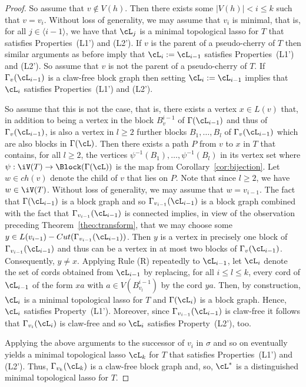 \begin{proof}
So assume that $v\not\in V(h)$. Then there exists some $|V(h)|< i\leq k$ such
that $v=v_i$. Without loss of generality, we may assume that $v_i$ is minimal,
that is, for all $j\in\langle i-1\rangle$, we have that $\cL_j$ is a minimal
topological lasso for $T$ that satisfies Properties~(L1') and (L2'). If $v$ is
the parent of a pseudo-cherry of $T$ then similar arguments as before imply
that $\cL_i:=\cL_{i-1}$ satisfies Properties~(L1') and (L2'). So assume that
$v$ is not the parent of a pseudo-cherry of $T$.  If $\Gamma_v(\cL_{i-1})$ is
a claw-free block graph then setting $\cL_i:=\cL_{i-1}$ implies that $\cL_i$
satisfies Properties~(L1') and (L2').

So assume that this is not the case, that is, there exists a vertex $x\in
L(v)$ that, in addition to being a vertex in the block $B_v^{i-1}$ of
$\Gamma(\cL_{i-1})$ and thus of $\Gamma_v(\cL_{i-1})$, is also a vertex in
$l\geq 2$ further blocks $B_1,\ldots, B_l$ of $\Gamma_v(\cL_{i-1})$ which are
also blocks in $\Gamma(\cL)$. Then there exists a path $P$ from $v$ to $x$ in
$T$ that contains, for all $l\geq 2$, the vertices $\psi^{-1}(B_1),\ldots,
\psi^{-1}(B_l)$ in its vertex set where $\psi:\iV(T)\to \Block(\Gamma(\cL))$
is the map from Corollary~\ref{cor:bijection}. Let $w\in ch(v)$ denote the
child of $v$ that lies on $P$. Note that since $l\geq 2$, we have $w\in
\iV(T)$. Without loss of generality, we may assume that $w=v_{i-1}$.  The fact
that $\Gamma(\cL_{i-1})$ is a block graph and so $\Gamma_{v_{i-1}}(\cL_{i-1})$
is a block graph combined with the fact that $\Gamma_{v_{i-1}}(\cL_{i-1})$ is
connected implies, in view of the observation preceding
Theorem~\ref{theo:transform}, that we may choose some $y\in
L(v_{i-1})-Cut(\Gamma_{v_{i-1}}(\cL_{i-1}))$. Then $y$ is a vertex in
precisely one block of $\Gamma_{v_{i-1}}(\cL_{i-1})$ and thus can be a vertex
in at most two blocks of $\Gamma_v(\cL_{i-1})$.  Consequently, $y\not=x$.
Applying Rule (R) repeatedly to $\cL_{i-1}$, let $\cL_i$ denote the set of
cords obtained from $\cL_{i-1}$ by replacing, for all $i\leq l\leq k$, every
cord of $\cL_{i-1}$ of the form $xa$ with $a\in V(B_{v_l}^{i-1})$ by the cord
$ya$. Then, by construction, $\cL_i$ is a minimal topological lasso for $T$
and $\Gamma(\cL_i)$ is a block graph. Hence, $\cL_i$ satisfies
Property~(L1'). Moreover, since $\Gamma_{v_{i-1}}(\cL_{i-1})$ is claw-free it
follows that $\Gamma_{v_i}(\cL_i)$ is claw-free and so $\cL_i$ satisfies
Property~(L2'), too.

Applying the above arguments to the successor of $v_i$ in $\sigma$ and so on
eventually yields a minimal topological lasso $\cL_k$ for $T$ that satisfies
Properties~(L1') and (L2'). Thus, $\Gamma_{v_k}(\cL_k) $ is a claw-free block
graph and, so, $\cL^*$ is a distinguished minimal topological lasso for $T$.
\end{proof}


